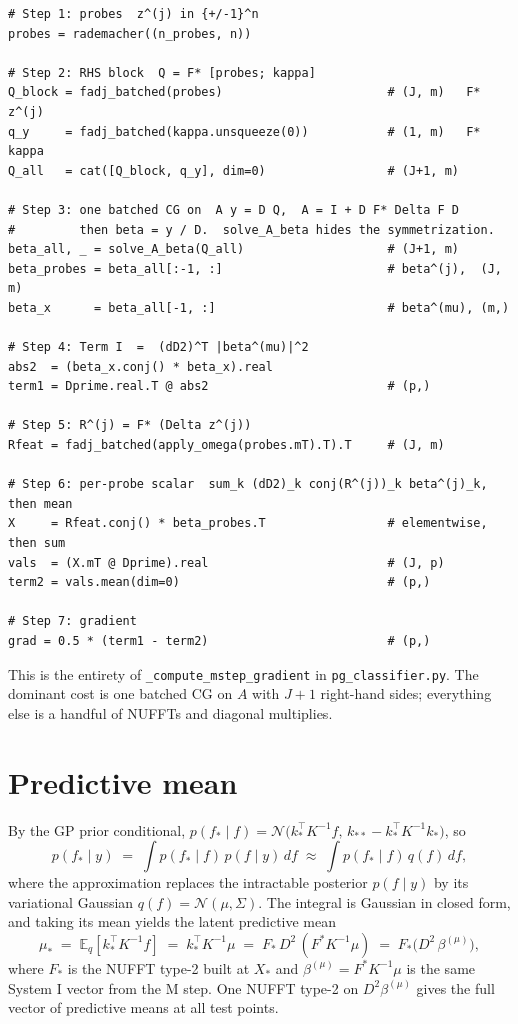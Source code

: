 \documentclass{article}
\newcommand{\E}{\mathbb{E}}
\begin{document}
\begin{lstlisting}
# Step 1: probes  z^(j) in {+/-1}^n
probes = rademacher((n_probes, n))

# Step 2: RHS block  Q = F* [probes; kappa]
Q_block = fadj_batched(probes)                       # (J, m)   F* z^(j)
q_y     = fadj_batched(kappa.unsqueeze(0))           # (1, m)   F* kappa
Q_all   = cat([Q_block, q_y], dim=0)                 # (J+1, m)

# Step 3: one batched CG on  A y = D Q,  A = I + D F* Delta F D
#         then beta = y / D.  solve_A_beta hides the symmetrization.
beta_all, _ = solve_A_beta(Q_all)                    # (J+1, m)
beta_probes = beta_all[:-1, :]                       # beta^(j),  (J, m)
beta_x      = beta_all[-1, :]                        # beta^(mu), (m,)

# Step 4: Term I  =  (dD2)^T |beta^(mu)|^2
abs2  = (beta_x.conj() * beta_x).real
term1 = Dprime.real.T @ abs2                         # (p,)

# Step 5: R^(j) = F* (Delta z^(j))
Rfeat = fadj_batched(apply_omega(probes.mT).T).T     # (J, m)

# Step 6: per-probe scalar  sum_k (dD2)_k conj(R^(j))_k beta^(j)_k, then mean
X     = Rfeat.conj() * beta_probes.T                 # elementwise, then sum
vals  = (X.mT @ Dprime).real                         # (J, p)
term2 = vals.mean(dim=0)                             # (p,)

# Step 7: gradient
grad = 0.5 * (term1 - term2)                         # (p,)
\end{lstlisting}

This is the entirety of \texttt{\_compute\_mstep\_gradient} in \texttt{pg\_classifier.py}. The dominant cost is one batched CG on $A$ with $J+1$ right-hand sides; everything else is a handful of NUFFTs and diagonal multiplies.

\section{Predictive mean}
\label{sec:pred-mean}

By the GP prior conditional, $p(f_{*}\mid f)=\mathcal{N}\!\bigl(k_{*}^{\top}K^{-1}f,\,k_{**}-k_{*}^{\top}K^{-1}k_{*}\bigr)$, so
\[
  p(f_{*}\mid y) \;=\; \int p(f_{*}\mid f)\,p(f\mid y)\,df
  \;\approx\; \int p(f_{*}\mid f)\,q(f)\,df,
\]
where the approximation replaces the intractable posterior $p(f\mid y)$ by its variational Gaussian $q(f)=\mathcal{N}(\mu,\Sigma)$. The integral is Gaussian in closed form, and taking its mean yields the latent predictive mean
\[
  \mu_{*} \;=\; \E_{q}[k_{*}^{\top}K^{-1}f]
  \;=\; k_{*}^{\top}K^{-1}\mu
  \;=\; F_{*}\,D^{2}\,(F^{*}K^{-1}\mu)
  \;=\; F_{*}\bigl(D^{2}\,\beta^{(\mu)}\bigr),
\]
where $F_{*}$ is the NUFFT type-2 built at $X_{*}$ and $\beta^{(\mu)}=F^{*}K^{-1}\mu$ is the same System I vector from the M step. One NUFFT type-2 on $D^{2}\beta^{(\mu)}$ gives the full vector of predictive means at all test points.
\end{document}

